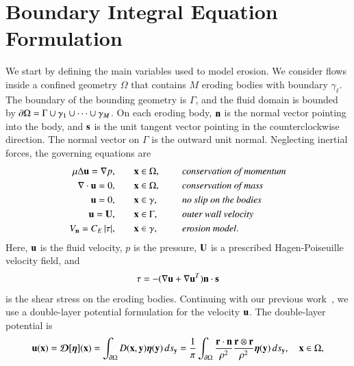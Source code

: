 \documentclass[preprint, 10pt]{elsarticle}
\begin{document}
\section{Boundary Integral Equation Formulation}
\label{s:formulation}
We start by defining the main variables used to model erosion.  We
consider flows inside a confined geometry $\Omega$ that contains $M$
eroding bodies with boundary $\gamma_\ell$.  The boundary of the
bounding geometry is $\Gamma$, and the fluid domain is bounded by $\bd
\Omega = \Gamma \cup \gamma_1 \cup \cdots \cup \gamma_M$.  On each
eroding body, $\nn$ is the normal vector pointing into the body, and
$\ss$ is the unit tangent vector pointing in the counterclockwise
direction.  The normal vector on $\Gamma$ is the outward unit normal.
Neglecting inertial forces, the governing equations are
\begin{equation}
\label{eqn:erosionModel}
\begin{split}
  \mu \Delta \uu = \grad p, &\hspace{20pt} \xx \in \Omega, \gap &&\mbox{\em conservation
of momentum}\\
\grad \cdot \uu = 0, &\hspace{20pt} \xx \in \Omega, \gap &&\mbox{\em conservation of mass} \\
\uu = 0, &\hspace{20pt} \xx \in \gamma, \gap &&\mbox{\em no slip on the
bodies} \\
\uu = \UU, &\hspace{20pt} \xx \in \Gamma, \gap &&\mbox{\em outer wall
velocity} \\
\Vn = \CE \, \abs{\tau}, &\hspace{20pt} \xx \in \gamma,
&&\mbox{\em erosion model}.
\end{split}
\end{equation}
Here, $\uu$ is the fluid velocity, $p$ is the pressure, $\UU$ is a
prescribed Hagen-Poiseuille velocity field, and
\begin{align}
  \tau = -(\nabla \uu + \nabla \uu^T) \nn \cdot \ss
  \label{eqn:shearStress}
\end{align}
is the shear stress on the eroding bodies.  Continuing with our previous
work~\cite{qua-moo2018}, we use a double-layer potential formulation for
the velocity $\uu$.  The double-layer potential is
\begin{align}
  \uu(\xx) = \DDD[\eeta](\xx) = 
    \int_{\bd\Omega} D(\xx,\yy) \eeta(\yy)\, ds_\yy = 
  \frac{1}{\pi}\int_{\bd\Omega} 
    \frac{\rr \cdot \nn}{\rho^2} \frac{\rr \otimes \rr}{\rho^2}
    \eeta(\yy) \, ds_\yy, \quad \xx \in \Omega,
  \label{eqn:stokesDLP}
\end{align}
\end{document}
